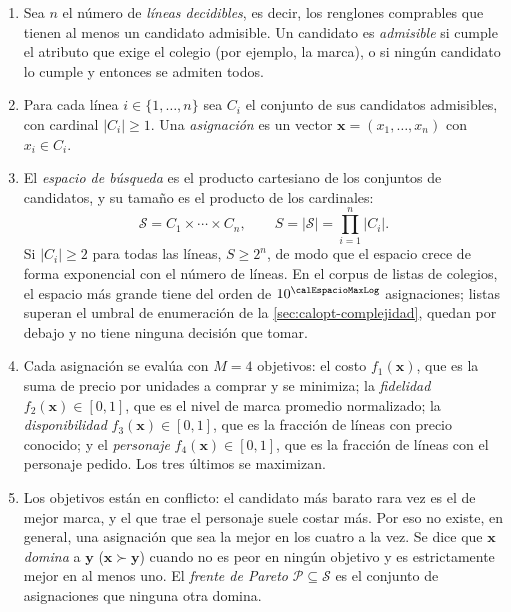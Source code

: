 \begin{enumerate}[label=\textbf{O\arabic*.}, ref=O\arabic*]
  \item\label{obs:lineas} Sea $n$ el número de \emph{líneas decidibles}, es
  decir, los renglones comprables que tienen al menos un candidato admisible.
  Un candidato es \emph{admisible} si cumple el atributo que exige el colegio
  (por ejemplo, la marca), o si ningún candidato lo cumple y entonces se admiten
  todos.

  \item\label{obs:conjuntos} Para cada línea $i\in\{1,\dots,n\}$ sea $C_i$ el
  conjunto de sus candidatos admisibles, con cardinal $|C_i|\geq1$. Una
  \emph{asignación} es un vector $\mathbf{x}=(x_1,\dots,x_n)$ con $x_i\in C_i$.

  \item\label{obs:espacio} El \emph{espacio de búsqueda} es el producto
  cartesiano de los conjuntos de candidatos, y su tamaño es el producto de los
  cardinales:
  \[
    \mathcal{S}=C_1\times\cdots\times C_n,\qquad
    S=|\mathcal{S}|=\prod_{i=1}^{n}|C_i| .
  \]
  Si $|C_i|\geq2$ para todas las líneas, $S\geq2^n$, de modo que el espacio
  crece de forma exponencial con el número de líneas. En el corpus de
  \calListas{} listas de \calColegios{} colegios, el espacio más grande tiene
  del orden de $10^{\calEspacioMaxLog}$ asignaciones; \calListasNsga{} listas
  superan el umbral de enumeración de la \cref{sec:calopt-complejidad},
  \calListasExacto{} quedan por debajo y \calListasTriviales{} no tiene ninguna
  decisión que tomar.

  \item\label{obs:objetivos} Cada asignación se evalúa con $M=4$ objetivos:
  el costo $f_1(\mathbf{x})$, que es la suma de precio por unidades a comprar
  y se minimiza; la \emph{fidelidad} $f_2(\mathbf{x})\in[0,1]$, que es el nivel
  de marca promedio normalizado; la \emph{disponibilidad}
  $f_3(\mathbf{x})\in[0,1]$, que es la fracción de líneas con precio conocido;
  y el \emph{personaje} $f_4(\mathbf{x})\in[0,1]$, que es la fracción de líneas
  con el personaje pedido. Los tres últimos se maximizan.

  \item\label{obs:conflicto} Los objetivos están en conflicto: el candidato más
  barato rara vez es el de mejor marca, y el que trae el personaje suele costar
  más. Por eso no existe, en general, una asignación que sea la mejor en los
  cuatro a la vez. Se dice que $\mathbf{x}$ \emph{domina} a $\mathbf{y}$
  ($\mathbf{x}\succ\mathbf{y}$) cuando no es peor en ningún objetivo y es
  estrictamente mejor en al menos uno. El \emph{frente de Pareto}
  $\mathcal{P}\subseteq\mathcal{S}$ es el conjunto de asignaciones que ninguna
  otra domina.


\end{enumerate}
